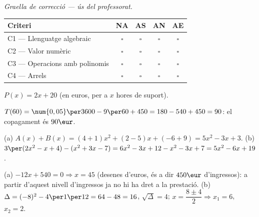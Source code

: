 \bigskip
\noindent\textit{Graella de correcció — ús del professorat.}
\begin{center}
\renewcommand{\arraystretch}{1.4}
\begin{tabular}{|p{5.6cm}|c|c|c|c|}
\hline
\textbf{Criteri} & \textbf{NA} & \textbf{AS} & \textbf{AN} & \textbf{AE} \\
\hline
C1 — Llenguatge algebraic & $\square$ & $\square$ & $\square$ & $\square$ \\
\hline
C2 — Valor numèric & $\square$ & $\square$ & $\square$ & $\square$ \\
\hline
C3 — Operacions amb polinomis & $\square$ & $\square$ & $\square$ & $\square$ \\
\hline
C4 — Arrels & $\square$ & $\square$ & $\square$ & $\square$ \\
\hline
\end{tabular}
\end{center}

\begin{solucions}
\begin{sollist}
  \item $P(x)=2x+20$ (en euros, per a $x$ hores de suport).
  \item $T(60)=\num{0,05}\per3600-9\per60+450=180-540+450=90$: el
        copagament és $90\eur$.
  \item (a) $A(x)+B(x)=(4+1)x^2+(2-5)x+(-6+9)=5x^2-3x+3$. \quad
        (b) $3\per(2x^2-x+4)-(x^2+3x-7)=6x^2-3x+12-x^2-3x+7
        =5x^2-6x+19$.
  \item (a) $-12x+540=0 \Rightarrow x=45$ (desenes d'euros, és a dir
        $450\eur$ d'ingressos): a partir d'aquest nivell d'ingressos ja
        no hi ha dret a la prestació. \quad
        (b) $\Delta=(-8)^2-4\per1\per12=64-48=16$, $\sqrt{\Delta}=4$;
        $x=\dfrac{8\pm4}{2} \Rightarrow x_1=6$, $x_2=2$.
\end{sollist}
\end{solucions}
